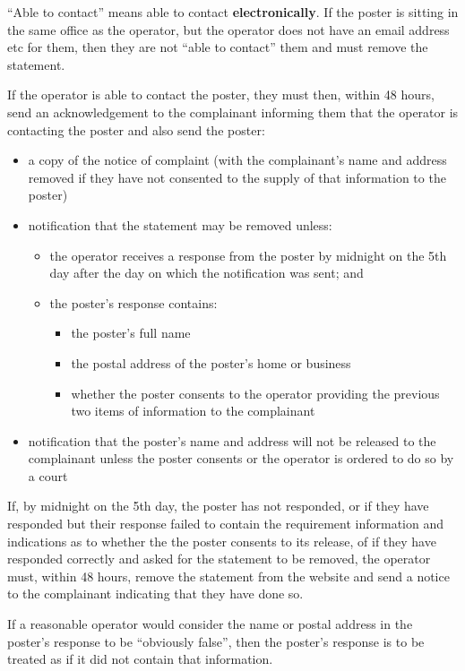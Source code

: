 \documentclass[]{article}
\begin{document}
``Able to contact'' means able to contact {\bf electronically}. If the poster is sitting in the same office as the operator, but the operator does not have an email address etc for them, then they are not ``able to contact'' them and must remove the statement.

If the operator is able to contact the poster, they must then, within 48 hours, send an acknowledgement to the complainant informing them that the operator is contacting the poster and also send the poster:

\begin{itemize}
\item a copy of the notice of complaint (with the complainant's name and address removed if they have not consented to the supply of that information to the poster)
\item notification that the statement may be removed unless:
  \begin{itemize}
  \item the operator receives a response from the poster by midnight on the 5th day after the day on which the notification was sent; and
  \item the poster's response contains:
    \begin{itemize}
    \item the poster's full name
    \item the postal address of the poster's home or business
    \item whether the poster consents to the operator providing the previous two items of information to the complainant
    \end{itemize}
  \end{itemize}
\item notification that the poster's name and address will not be released to the complainant unless the poster consents or the operator is ordered to do so by a court
\end{itemize}

If, by midnight on the 5th day, the poster has not responded, or if they have responded but their response failed to contain the requirement information and indications as to whether the the poster consents to its release, of if they have responded correctly and asked for the statement to be removed, the operator must, within 48 hours, remove the statement from the website and send a notice to the complainant indicating that they have done so. 

If a reasonable operator would consider the name or postal address in the poster's response to be ``obviously false'', then the poster's response is to be treated as if it did not contain that information.
\end{document}
